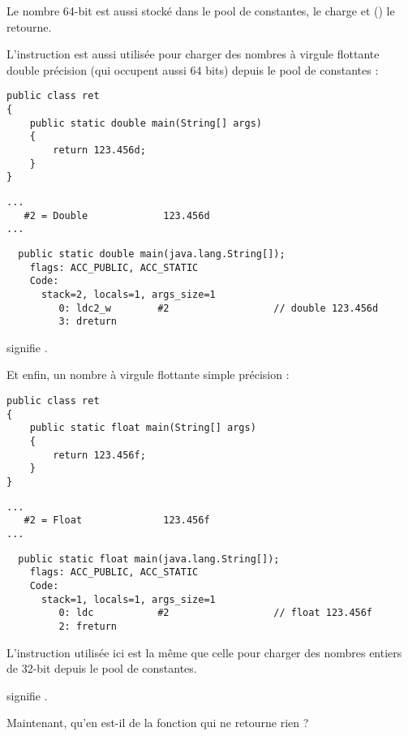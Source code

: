 Le nombre 64-bit est aussi stocké dans le pool de constantes,  le charge et  
() le retourne.

L'instruction  est aussi utilisée pour charger des nombres à virgule flottante double précision 
(qui occupent aussi 64 bits) depuis le pool de constantes :

\begin{lstlisting}[style=customjava]
public class ret
{
	public static double main(String[] args)
	{
		return 123.456d;
	}
}
\end{lstlisting}

\begin{lstlisting}[caption=Constant pool]
...
   #2 = Double             123.456d
...
\end{lstlisting}

\begin{lstlisting}
  public static double main(java.lang.String[]);
    flags: ACC_PUBLIC, ACC_STATIC
    Code:
      stack=2, locals=1, args_size=1
         0: ldc2_w        #2                  // double 123.456d
         3: dreturn       
\end{lstlisting}

 signifie .

Et enfin, un nombre à virgule flottante simple précision :

\begin{lstlisting}[style=customjava]
public class ret
{
	public static float main(String[] args)
	{
		return 123.456f;
	}
}
\end{lstlisting}

\begin{lstlisting}[caption=Constant pool]
...
   #2 = Float              123.456f
...
\end{lstlisting}

\begin{lstlisting}
  public static float main(java.lang.String[]);
    flags: ACC_PUBLIC, ACC_STATIC
    Code:
      stack=1, locals=1, args_size=1
         0: ldc           #2                  // float 123.456f
         2: freturn       
\end{lstlisting}

L'instruction  utilisée ici est la même que celle pour charger des nombres entiers de 32-bit
depuis le pool de constantes.

 signifie .

Maintenant, qu'en est-il de la fonction qui ne retourne rien ?

